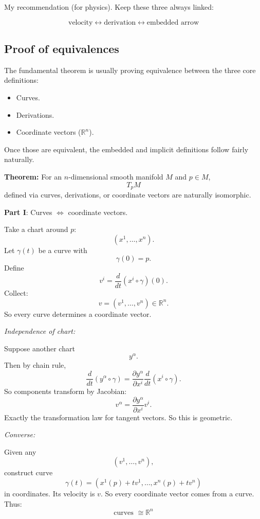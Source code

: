 \documentclass[aps,prl,twocolumn,groupedaddress]{revtex4-2}
\begin{document}
My recommendation (for physics). Keep these three always linked:

$$
\boxed{
\text{velocity}
\leftrightarrow
\text{derivation}
\leftrightarrow
\text{embedded arrow}
}
$$

\subsection{Proof of equivalences}

The fundamental theorem is usually proving equivalence between the three core definitions:
\begin{itemize}
\item Curves.
\item Derivations.
\item Coordinate vectors ($\mathbb R^n$).
\end{itemize}
Once those are equivalent, the embedded and implicit definitions follow fairly naturally.

\vspace{0.5cm}
{\bf Theorem:} For an $n$-dimensional smooth manifold $M$ and $p\in M$,
$$
T_pM
$$
defined via curves, derivations, or coordinate vectors are naturally isomorphic.

\vspace{0.5cm}
\noindent
{\bf Part I}: Curves $\Longleftrightarrow$ coordinate vectors.

Take a chart around $p$:
$$
(x^1,\dots,x^n).
$$
Let $\gamma(t)$ be a curve with
$$
\gamma(0)=p.
$$
Define
$$
v^i
=
\frac d{dt}(x^i\circ \gamma)(0).
$$
Collect:
$$
v=(v^1,\dots,v^n)\in \mathbb R^n.
$$
So every curve determines a coordinate vector.

\vspace{0.5cm}
\noindent
{\em Independence of chart:}

Suppose another chart
$$
y^\alpha.
$$
Then by chain rule,
$$
\frac d{dt}(y^\alpha\circ\gamma)
=
\frac{\partial y^\alpha}{\partial x^i}
\frac d{dt}(x^i\circ\gamma).
$$
So components transform by Jacobian:
$$
v^\alpha
=
\frac{\partial y^\alpha}{\partial x^i}v^i.
$$
Exactly the transformation law for tangent vectors.
So this is geometric.

\vspace{0.5cm}
\noindent
{\em Converse:}

Given any
$$
(v^1,\dots,v^n),
$$
construct curve
$$
\gamma(t)
=
(x^1(p)+tv^1,\dots,x^n(p)+tv^n)
$$
in coordinates.
Its velocity is $v$.
So every coordinate vector comes from a curve.
Thus:
$$
\boxed{
\text{curves } \cong \mathbb R^n
}
$$
\end{document}
